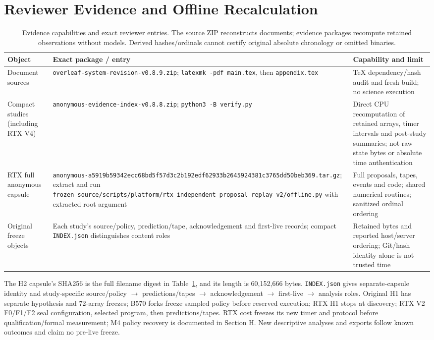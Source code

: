 \section{Reviewer Evidence and Offline Recalculation}
\label{app:evidence}
\begin{table}[t]
\caption{Evidence capabilities and exact reviewer entries. The source ZIP reconstructs documents; evidence packages recompute retained observations without models. Derived hashes/ordinals cannot certify original absolute chronology or omitted binaries.}
\label{tab:evidenceentries}
\centering
\begin{tabular}{@{}p{1.55in}p{2.80in}p{1.9in}@{}}
\toprule
Object & Exact package / entry & Capability and limit \\
\midrule
Document sources & \nolinkurl{overleaf-system-revision-v0.8.9.zip}; \texttt{latexmk -pdf main.tex}, then \texttt{appendix.tex} & TeX dependency/hash audit and fresh build; no science execution \\
Compact studies (including RTX V4) & \nolinkurl{anonymous-evidence-index-v0.8.8.zip}; \texttt{python3 -B verify.py} & Direct CPU recomputation of retained arrays, timer intervals and post-study summaries; not raw state bytes or absolute time authentication \\
RTX full anonymous capsule & \nolinkurl{anonymous-a5919b59342ecc68bd5f57d3c2b192edf62933b2645924381c3765dd50beb369.tar.gz}; extract and run \nolinkurl{frozen_source/scripts/platform/rtx_independent_proposal_replay_v2/offline.py} with extracted root argument & Full proposals, tapes, events and code; shared numerical routines; sanitized ordinal ordering \\
Original freeze objects & Each study's source/policy, prediction/tape, acknowledgement and first-live records; compact \texttt{INDEX.json} distinguishes content roles & Retained bytes and reported host/server ordering; Git/hash identity alone is not trusted time \\
\bottomrule
\end{tabular}
\end{table}
The H2 capsule's SHA256 is the full filename digest in Table~\ref{tab:evidenceentries}, and its length is 60,152,666 bytes. \texttt{INDEX.json} gives separate-capsule identity and study-specific source/policy $\to$ predictions/tapes $\to$ acknowledgement $\to$ first-live $\to$ analysis roles. Original H1 has separate hypothesis and 72-array freezes; B570 forks freeze sampled policy before reserved execution; RTX H1 stops at discovery; RTX V2 F0/F1/F2 seal configuration, selected program, then predictions/tapes. RTX cost freezes its new timer and protocol before qualification/formal measurement; M4 policy recovery is documented in Section H. New descriptive analyses and exports follow known outcomes and claim no pre-live freeze.

